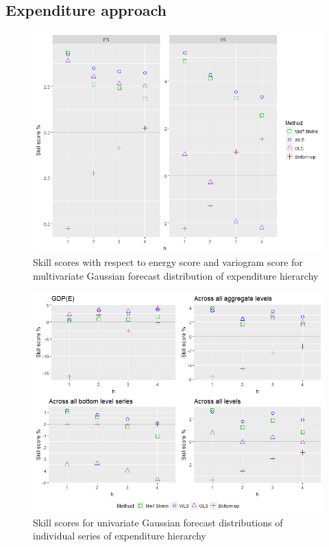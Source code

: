 \documentclass[graybox]{svmult}
\begin{document}
\subsection*{Expenditure approach}

\begin{figure}[H]
	\centering
	\small
	\includegraphics[scale=0.50]{Figs/Results/EXP-ProbNonParaF-MultivS_ES_VS.png}
	\caption{Skill scores with respect to energy score and variogram score for multivariate Gaussian forecast distribution of expenditure hierarchy}\label{Exp_ProbNonParF_ES_VS}
\end{figure}

\begin{figure}[H]
	\centering
	\small
	\includegraphics[scale=0.50]{Figs/Results/EXP-ProbNonParaF-UnivS_CRPS.png}
	\caption{Skill scores for univariate Gaussian forecast distributions of individual series of expenditure hierarchy}\label{Exp_ProbNonParF_UnivS}
\end{figure}
\end{document}
